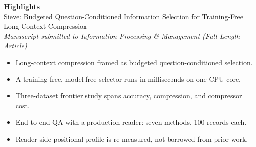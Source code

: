 \documentclass[12pt]{article}
\newcommand{\PaperTitle}{Sieve: Budgeted Question-Conditioned
Information Selection for Training-Free Long-Context Compression}
\begin{document}
\begin{center}
{\LARGE\bfseries Highlights}\\[0.6em]
{\large \PaperTitle{}\\[0.35em]}
{\normalsize\itshape Manuscript submitted to Information Processing \& Management
(Full Length Article)}
\end{center}

\vspace{1.2em}

\begin{itemize}[leftmargin=1.6em, itemsep=0.55em]
\item Long-context compression framed as budgeted question-conditioned selection.
\item A training-free, model-free selector runs in milliseconds on one CPU core.
\item Three-dataset frontier study spans accuracy, compression, and compressor cost.
\item End-to-end QA with a production reader: seven methods, 100 records each.
\item Reader-side positional profile is re-measured, not borrowed from prior work.
\end{itemize}
\end{document}
